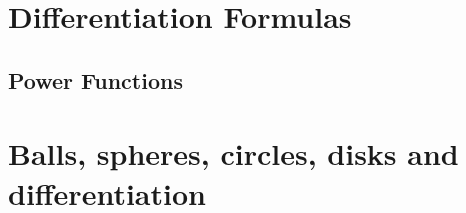 \documentclass%
[handout]
{beamer}
\begin{document}
{\section{Differentiation Formulas}

\subsection{Power Functions}



\section{Balls, spheres, circles, disks and differentiation}
\youWillNotBeTested

}%
\end{document}
